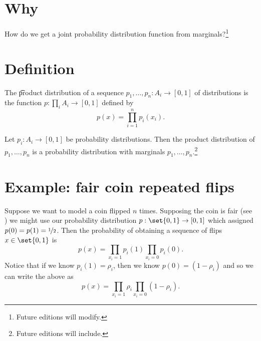 

\section*{Why}

How do we get a joint probability distribution function from marginals?\footnote{Future editions will modify.}

\section*{Definition}

The \t{product distribution} of a sequence $p_1, \dots , p_n: A_i \to [0, 1]$ of distributions is the function $p: \prod_{i} A_i \to [0, 1]$ defined by
\[
p(x) = \prod_{i = 1}^{n} p_i(x_i).
\]

\begin{proposition}
Let $p_i: A_i \to [0, 1]$ be probability distributions.
Then the product distribution of $p_1, \dots , p_n$ is a probability distribution with marginals $p_1, \dots , p_n$.\footnote{Future editions will include.}
\end{proposition}

\section*{Example: fair coin repeated flips}

Suppose we want to model a coin flipped $n$ times.
Supposing the coin is fair (see ) we might use our probability distribution $p: \set{0, 1} \to [0, 1]$ which assigned $p(0) = p(1) = \nicefrac{1}{2}$.
Then the probability of obtaining a sequence of flips $x \in \set{0, 1}$ is
\[
\textstyle
p(x) = \prod_{x_i = 1} p_i(1) \prod_{x_i = 0} p_i(0).
\]
Notice that if we know $p_i(1) = \rho _i$, then we know $p(0) = (1-\rho _i)$ and so we can write the above as
\[
\textstyle
p(x) = \prod_{x_i = 1} \rho _i \prod_{x_i = 0} (1-\rho _i).
\]
